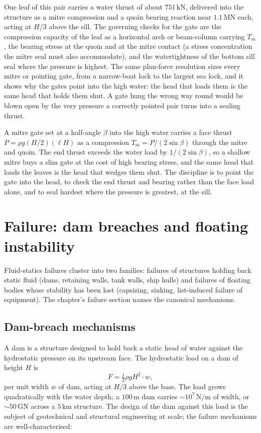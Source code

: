 One leaf of this pair carries a water thrust of about $751\,\text{kN}$,
delivered into the structure as a mitre compression and a quoin bearing
reaction near $1.1\,\text{MN}$ each, acting at $H/3$ above the sill. The
governing checks for the gate are the compression capacity of the leaf as a
horizontal arch or beam-column carrying $T_m$, the bearing stress at the
quoin and at the mitre contact (a stress concentration the mitre seal must
also accommodate), and the watertightness of the bottom sill seal where the
pressure is highest. The same plan-force resolution sizes every mitre or
pointing gate, from a narrow-boat lock to the largest sea lock, and it
shows why the gates point into the high water: the head that loads them is
the same head that holds them shut. A gate hung the wrong way round would
be blown open by the very pressure a correctly pointed pair turns into a
sealing thrust.

\begin{principle}
A mitre gate set at a half-angle $\beta$ into the high water carries a face
thrust $P=\rho g(H/2)(\ell H)$ as a compression $T_m=P/(2\sin\beta)$ through
the mitre and quoin. The end thrust exceeds the water load by $1/(2\sin
\beta)$, so a shallow mitre buys a slim gate at the cost of high bearing
stress, and the same head that loads the leaves is the head that wedges them
shut. The discipline is to point the gate into the head, to check the end
thrust and bearing rather than the face load alone, and to seal hardest
where the pressure is greatest, at the sill.
\end{principle}

\section{Failure: dam breaches and floating instability}

Fluid-statics failures cluster into two families: failures of
structures holding back static fluid (dams, retaining walls,
tank walls, ship hulls) and failures of floating bodies whose
stability has been lost (capsizing, sinking, list-induced
failure of equipment). The chapter's failure section names the
canonical mechanisms.

\subsection{Dam-breach mechanisms}

A dam is a structure designed to hold back a static head of
water against the hydrostatic pressure on its upstream face. The
hydrostatic load on a dam of height $H$ is
\[
F = \tfrac{1}{2} \rho g H^2 \cdot w,
\]
per unit width $w$ of dam, acting at $H/3$ above the base. The
load grows quadratically with the water depth; a $100\,\si{\meter}
$ dam carries $\sim 10^7\,\text{N}/\text{m}$ of width, or $\sim
50\,\text{GN}$ across a $5\,\si{\kilo\meter}$ structure. The design
of the dam against this load is the subject of geotechnical and
structural engineering at scale; the failure mechanisms are
well-characterised:

